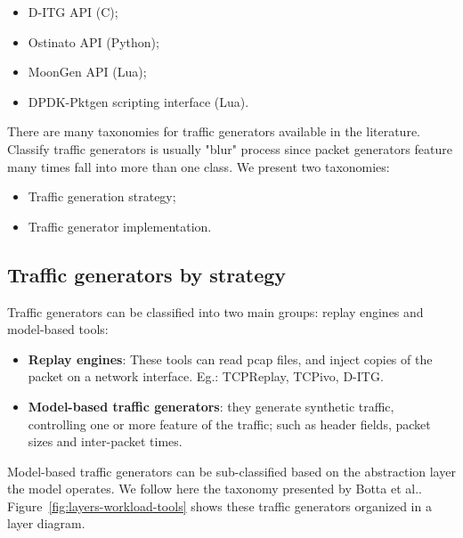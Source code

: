 \begin{itemize}
\item D-ITG API (C)\cite{web-ditg};
\item Ostinato API (Python)\cite{web-ostinato};
\item MoonGen API (Lua)\cite{web-moongen};
\item DPDK-Pktgen scripting interface (Lua)\cite{web-dpdk-pktgen}.
\end{itemize}

There are many taxonomies for traffic generators available in the literature. Classify traffic generators is usually "blur" process since packet generators feature many times fall into more than one class. We present two taxonomies:

\begin{itemize}
\item Traffic generation strategy;
\item Traffic generator implementation.
\end{itemize}

\subsection{Traffic generators by strategy}


Traffic generators can be classified into two main groups: replay engines\cite{sourcesonoff-paper} and model-based tools:

\begin{itemize}
\item \textbf{Replay engines}: These tools can read pcap files, and inject copies of the packet on a network interface. Eg.: TCPReplay\cite{web-tcpreplay}, TCPivo\cite{tcpivo-paper}, D-ITG\cite{ditg-paper}.
\item \textbf{Model-based traffic generators}: they generate synthetic traffic, controlling one or more feature of the traffic; such as header fields, packet sizes and inter-packet times.  
\end{itemize}

Model-based traffic generators can be sub-classified based on the abstraction layer the model operates. We follow here the taxonomy presented by Botta et al.\cite{do-you-trust}. Figure~\ref{fig:layers-workload-tools} shows these traffic generators organized in a layer diagram.


